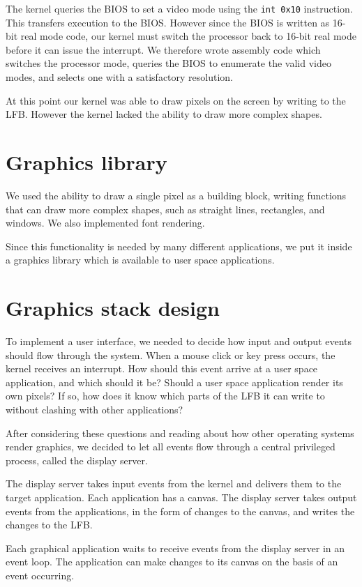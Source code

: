 \documentclass{report}
\begin{document}
The kernel queries the BIOS to set a video mode using the
\texttt{int 0x10} instruction. This transfers execution to the BIOS. However
since the BIOS is written as 16-bit real mode code, our kernel must switch the
processor back to 16-bit real mode before it can issue the interrupt.
We therefore wrote assembly code which switches the processor mode,
queries the BIOS to enumerate the valid video modes, and selects one with a
satisfactory resolution.

At this point our kernel was able to draw pixels on the screen by writing to
the LFB. However the kernel lacked the ability to draw more complex shapes.


\section{Graphics library}
We used the ability to draw a single pixel as a building block, writing
functions that can draw more complex shapes, such as straight lines,
rectangles, and windows. We also implemented font rendering.

Since this functionality is needed by many different applications, we put it
inside a graphics library which is available to user space applications.


\section{Graphics stack design}
To implement a user interface, we needed to decide how input and output events
should flow through the system. When a mouse click or key press occurs, the
kernel receives an interrupt. How should this event arrive at a user space
application, and which should it be? Should a user space application render
its own pixels? If so, how does it know which parts of the LFB it can write to
without clashing with other applications? 

After considering these questions and reading about how other operating
systems render graphics, we decided to let all events flow through a central
privileged process, called the display server. 

The display server takes input events from the kernel and delivers them to the
target application. Each application has a canvas. The display server takes
output events from the applications, in the form of changes to the canvas, and
writes the changes to the LFB.

Each graphical application waits to receive events from the display server in
an event loop. The application can make changes to its canvas on the basis of
an event occurring.
\end{document}
